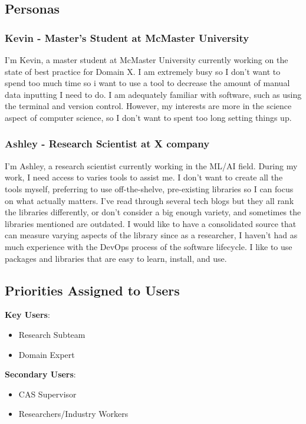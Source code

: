 \documentclass[12pt]{article}
\begin{document}
\subsection{Personas}
\subsubsection{Kevin - Master's Student at McMaster University}
I’m Kevin, a master student at McMaster University currently working on the state of best practice for Domain X. I am extremely busy so I don’t want to spend too much time so i want to use a tool to decrease the amount of manual data inputting I need to do. I am adequately familiar with software, such as using the terminal and version control. However, my interests are more in the science aspect of computer science, so I don’t want to spent too long setting things up.
\subsubsection{Ashley - Research Scientist at X company}
I’m Ashley, a research scientist currently working in the ML/AI field. During my work, I need access to varies tools to assist me. I don’t want to create all the tools myself, preferring to use off-the-shelve, pre-existing libraries so I can focus on what actually matters. I’ve read through several tech blogs but they all rank the libraries differently, or don’t consider a big enough variety, and sometimes the libraries mentioned are outdated. I would like to have a consolidated source that can measure varying aspects of the library since as a researcher, I haven’t had as much experience with the DevOps process of the software lifecycle. I like to use packages and libraries that are easy to learn, install, and use.

\subsection{Priorities Assigned to Users}
\textbf{Key Users}:
\begin{itemize}
\item Research Subteam
\item Domain Expert
\end{itemize}
\textbf{Secondary Users}:
\begin{itemize}
\item CAS Supervisor
\item Researchers/Industry Workers
\end{itemize}
\end{document}
